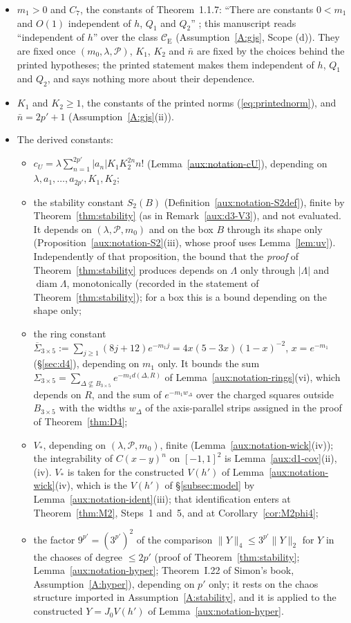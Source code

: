 \documentclass[11pt,a4paper]{article}
\theoremstyle{plain}
\theoremstyle{definition}
\theoremstyle{plain}
\theoremstyle{definition}
\newcommand{\CE}{\mathcal{C}_{\mathrm E}}
\begin{document}
\begin{itemize}
\item[(F1)] $m_1>0$ and $C_7$, the constants of Theorem~1.1.7: ``There are constants $0<m_1$
and $O(1)$ independent of $h$, $Q_1$ and $Q_2$'' \cite[p.~594]{GJS}; this manuscript reads
``independent of $h$'' over the class $\CE$ (Assumption~\ref{A:gjs}, Scope (d)).
They are fixed once $(m_0,\lambda,\mathscr P)$, $K_1$, $K_2$ and $\bar n$ are fixed by the
choices behind the printed hypotheses; the printed statement makes them independent of $h$,
$Q_1$ and $Q_2$, and says nothing more about their dependence.
\item[(F2)] $K_1$ and $K_2\ge1$, the constants of the printed norms (\eqref{eq:printednorm}), and $\bar n=2p'+1$ (Assumption~\ref{A:gjs}(ii)).
\item[(F3)] The derived constants:
\begin{itemize}
\item $c_U=\lambda\sum_{n=1}^{2p'}|a_n|K_1K_2^{2n}n!$ (Lemma~\ref{aux:notation-cU}),
depending on $\lambda,a_1,\dots,a_{2p'},K_1,K_2$;
\item the stability constant $S_2(B)$ (Definition~\ref{aux:notation-S2def}), finite by
Theorem~\ref{thm:stability} (as in Remark~\ref{aux:d3-V3}), and not evaluated. It depends on $(\lambda,\mathscr P,m_0)$ and on the box $B$
through its shape only (Proposition~\ref{aux:notation-S2}(iii), whose proof uses Lemma~\ref{lem:uv}).
Independently of that proposition, the bound that the \emph{proof} of Theorem~\ref{thm:stability} produces
depends on $\Lambda$ only through $|\Lambda|$ and $\operatorname{diam}\Lambda$, monotonically
(recorded in the statement of Theorem~\ref{thm:stability}); for a box
this is a bound depending on the shape only;
\item the ring constant
$\overline\Sigma_{3\times5}:=\sum_{j\ge1}(8j+12)e^{-m_1j}=4x(5-3x)(1-x)^{-2}$, $x=e^{-m_1}$
(\S\ref{sec:d4}), depending on $m_1$ only. It bounds the sum
$\Sigma_{3\times5}=\sum_{\Delta\not\subseteq B_{3\times5}}e^{-m_1d(\Delta,R)}$ of
Lemma~\ref{aux:notation-rings}(vi), which depends on $R$, and the sum of $e^{-m_1w_\Delta}$
over the charged squares outside $B_{3\times5}$ with the widths $w_\Delta$ of the axis-parallel
strips assigned in the proof of Theorem~\ref{thm:D4};
\item $V_*$, depending on $(\lambda,\mathscr P,m_0)$, finite (Lemma~\ref{aux:notation-wick}(iv));
the integrability of $C(x-y)^n$ on $[-1,1]^2$ is Lemma~\ref{aux:d1-cov}(ii),(iv).  $V_*$ is
taken for the constructed $V(h')$ of Lemma~\ref{aux:notation-wick}(iv), which is the $V(h')$
of \S\ref{subsec:model} by Lemma~\ref{aux:notation-ident}(iii); that identification enters at
Theorem~\ref{thm:M2}, Steps~1 and~5, and at Corollary~\ref{cor:M2phi4};
\item the factor $9^{p'}=(3^{p'})^2$ of the comparison $\|Y\|_4\le3^{p'}\|Y\|_2$ for $Y$ in the
chaoses of degree $\le2p'$ (proof of Theorem~\ref{thm:stability}; Lemma~\ref{aux:notation-hyper};
Theorem~I.22 of Simon's book, Assumption~\ref{A:hyper}), depending on $p'$ only; it rests on
the chaos structure imported in Assumption~\ref{A:stability}, and it is applied to the
constructed $Y=J_0V(h')$ of Lemma~\ref{aux:notation-hyper}.
\end{itemize}
\end{itemize}
\end{document}
